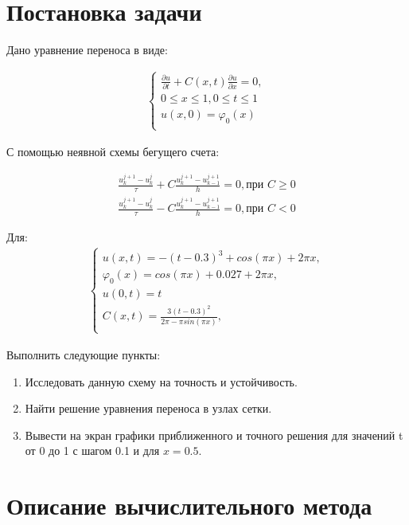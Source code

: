 \documentclass[12pt,a4paper]{scrartcl}
\begin{document}


\newpage
\section{Постановка задачи}
	
Дано уравнение переноса в виде:
	
\begin{align}\label{main}
	\begin{cases}
    	\frac{\partial u}{\partial t}+C(x,t) \frac{\partial u}{\partial x}=0, \\
	    0\le x \le 1, 0\le t \le1 \\        
	    u(x,0)=\varphi_{0}(x) \\
	\end{cases}
\end{align}
	
С помощью неявной схемы бегущего счета:

\begin{align}\label{method}
	\frac{u^{j+1}_{k}-u^{j}_k}{\tau}+C\frac{u^{j+1}_{k}-u^{j+1}_{k-1}}{h}=0, \text{при } C \ge 0 \\
	\frac{u^{j+1}_{k}-u^{j}_k}{\tau}-C\frac{u^{j+1}_{k}-u^{j+1}_{k-1}}{h}=0, \text{при } C < 0 
\end{align}
	
Для:
\begin{align*}
	\begin{cases}
	u(x,t) = -(t-0.3)^3+cos(\pi x)+2 \pi x, \\
	\varphi_{0}(x) = cos(\pi x)+0.027+2 \pi x, \\
	u(0,t) = t \\
	C(x,t) = \frac{3(t-0.3)^2}{2 \pi - \pi sin(\pi x)},\\
	\end{cases}
\end{align*}

Выполнить следующие пункты:

\begin{enumerate}
	\item Исследовать данную схему на точность и устойчивость.
	\item Найти решение уравнения переноса в узлах сетки.
	\item Вывести на экран графики приближенного и точного решения для значений t от 0 до 1 с шагом 0.1 и для $x = 0.5$.
\end{enumerate}

\section{Описание вычислительного метода}
\end{document}
